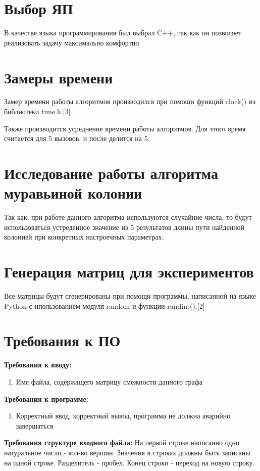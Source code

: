 \documentclass[12pt]{report}
\begin{document}
	\section{Выбор ЯП}
	В качестве языка программирования был выбрал C++, так как он позволяет реализовать задачу максимально комфортно.
	
	\section{Замеры времени}
	Замер времени работы алгоритмов производился при помощи функций clock() из библиотеки time.h.[3]
	
	Также производится усреднение времени работы алгоритмов. Для этого время считается для 5 вызовов, и после делится на 5.
	
	\section{Исследование работы алгоритма муравьиной колонии}

	Так как, при работе данного алгоритма используются случайние числа, то будут использоваться устреденное значение из 5 результатов длины пути найденной колонией при конкретных настроечных параметрах.
	
	\section{Генерация матриц для экспериментов}
	
	Все матрицы будут сгенерированы при помощи программы, написанной на языке Python с ипользованием модуля random и функции randint().[2]
	
	
	\section{Требования к ПО}
	
	\textbf{Требования к вводу:}
	\begin{enumerate}
		\item Имя файла, содержащего матрицу смежности данного графа
	\end{enumerate}
	\textbf{Требования к программе:}
	\begin{enumerate}
		\item Корректный ввод, корректный вывод, программа не должна аварийно завершаться
	\end{enumerate}
	
	\textbf{Требования структуре входного файла:}
	На первой строке написанно одно натуральное число - кол-во вершин.
	Значения в строках должны быть записаны на одной строке. Разделитель - пробел. Конец строки - переход на новую строку.
	
\end{document}
